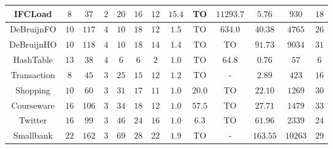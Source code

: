 \begin{table}[t!]
\begin{tabular}{c||ccc||ccc||ccc||c|cc}
 \midrule
 \textsf{IFCLoad}\cite{pbt-ifc} & $8$ & $37$ & $2$ & $20$ & $16$ & $12$ & $15.4$ & {\tiny TO} & $11293.7$ & $5.76$ & $930$ & $18$\\
 \midrule
 \textsf{DeBruijnFO}\cite{CoverageType} & $10$ & $117$ & $4$ & $10$ & $18$ & $12$ & $1.5$ & {\tiny TO} & $634.0$  & $40.38$ & $4765$ & $26$\\
 \midrule
 \textsf{DeBruijnHO}\cite{CoverageType} & $10$ & $118$ & $4$ & $10$ & $18$ & $14$ & $1.4$ & {\tiny TO} & {\tiny TO} & $91.73$ & $9034$ & $31$\\
 \midrule
 \textsf{HashTable}\cite{OcamlMulticorePBT} & $13$ & $38$ & $4$ & $6$ & $6$ & $2$ & $1.0$ & {\tiny TO} & $64.8$ & $0.76$ & $57$ & $6$\\
 \midrule
 \textsf{Transaction} & $8$ & $45$ & $3$ & $25$ & $15$ & $12$ & $1.2$ & {\tiny TO} & - & $2.89$ & $423$ & $16$\\
 \midrule
 \textsf{Shopping}\cite{MonkeyDB} & $10$ & $60$ & $3$ & $31$ & $17$ & $11$ & $1.0$ & $20.0$ & {\tiny TO} & $22.10$ & $1269$ & $30$\\
 \midrule
 \textsf{Courseware}\cite{MonkeyDB} & $16$ & $106$ & $3$ & $34$ & $18$ & $12$ & $1.0$ & $57.5$ & {\tiny TO} & $27.71$ & $1479$ & $33$\\
 \midrule
 \textsf{Twitter}\cite{MonkeyDB} & $16$ & $99$ & $3$ & $46$ & $24$ & $16$ & $1.0$ & $6.3$ & {\tiny TO} & $61.96$ & $2339$ & $24$\\
 \midrule
 \textsf{Smallbank}\cite{MonkeyDB} & $22$ & $162$ & $3$ & $69$ & $28$ & $22$ & $1.9$ & {\tiny TO} & - & $163.55$ & $10263$ & $29$\\
 \bottomrule
 \end{tabular}
\label{tab:evaluation-detail}
\end{table}

